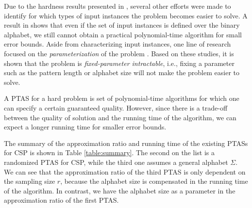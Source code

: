 \documentclass[journal]{acm_proc_article-sp}
\begin{document}
Due to the hardness results presented in \cite{Bodlaender1995}, several other efforts were made to identify  for which types of input instances the problem becomes easier to solve. A result in \cite{Brejova2006} shows that even if the set of input instances is defined over the binary alphabet, we still cannot obtain a practical polynomial-time algorithm for small error bounds.  Aside from characterizing input instances, one line of research focused on the \textit{parameterization} of the problem  \cite{Evans2003}. Based on these studies, it is shown that the problem is \textit{fixed-parameter intractable}, i.e., fixing a parameter such as the pattern length or alphabet size will not make the problem easier to solve.

A PTAS for a hard problem is set of polynomial-time algorithms  for which one can specify a certain guaranteed quality. However, since there is a trade-off between the quality of solution and the  running time of the algorithm, we can expect a longer running time for smaller error bounds. 

The summary of the approximation ratio and running time of the existing PTASs for CSP is shown in Table \ref{table:summary}. The second on the list is a randomized PTAS for CSP, while the third one assumes a general alphabet $\Sigma$. We can see that the approximation ratio of the third PTAS is only dependent on the sampling size $r$, because the alphabet size is compensated in the running time of the algorithm. In contrast, we have the alphabet size as a parameter in the approximation ratio of the first PTAS. 

\begin{table}
\centering
{}
\caption{Summary of approximation ratio and running time of the existing PTASs for CSP in the literature.}
\label{table:summary}
\end{table}
\end{document}
